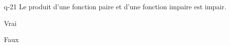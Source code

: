 \begin{truefalse}{q-21}
Le produit d'une fonction paire et d'une fonction impaire est impair.
\item* Vrai
\item Faux
\end{truefalse}

